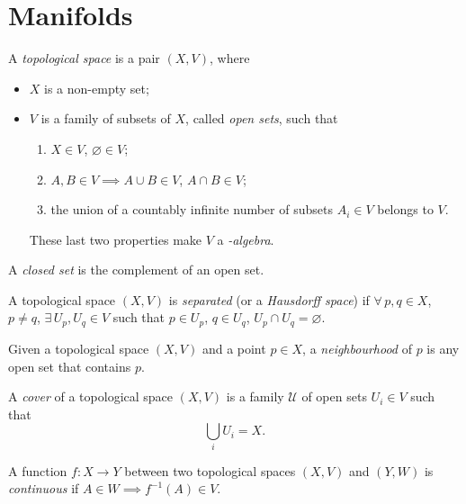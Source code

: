 \documentclass[a4paper,12pt]{book}
\newcommand{\tuple}[1]{({#1})}
\begin{document}
\section{Manifolds}

\begin{definition}
A \emph{topological space} is a pair $\tuple{X,V}$, where
\begin{itemize}
\item $X$ is a non-empty set;
\item $V$ is a family of subsets of $X$, called \emph{open sets}, such that
\begin{enumerate}
\item $X\in V$, $\varnothing\in V$;
\item $A,B\in V\implies A\cup B\in V$, $A\cap B\in V$;
\item the union of a countably infinite number of subsets $A_i\in V$ belongs to $V$.
\end{enumerate}
These last two properties make $V$ a \emph{\sigma-algebra}.
\end{itemize}
\end{definition}

\begin{definition}
A \emph{closed set} is the complement of an open set.
\end{definition}

\begin{definition}
A topological space $\tuple{X,V}$ is \emph{separated} (or a \emph{Hausdorff space}) if $\forall\, p,q\in X$, $p\ne q$, $\exists\, U_p,U_q\in V$ such that $p\in U_p$, $q\in U_q$, $U_p\cap U_q=\varnothing$.
\end{definition}

\begin{definition}
Given a topological space $\tuple{X,V}$ and a point $p\in X$, a \emph{neighbourhood} of $p$ is any open set that contains $p$.
\end{definition}

\begin{definition}
A \emph{cover} of a topological space $\tuple{X,V}$ is a family $\mathcal U$ of open sets $U_i\in V$ such that
\[\bigcup_i U_i=X.\]
\end{definition}

\begin{definition}
A function $f\colon X\to Y$ between two topological spaces $\tuple{X,V}$ and $\tuple{Y,W}$ is \emph{continuous} if $A\in W\implies f^{-1}(A)\in V$.
\end{definition}
\end{document}
